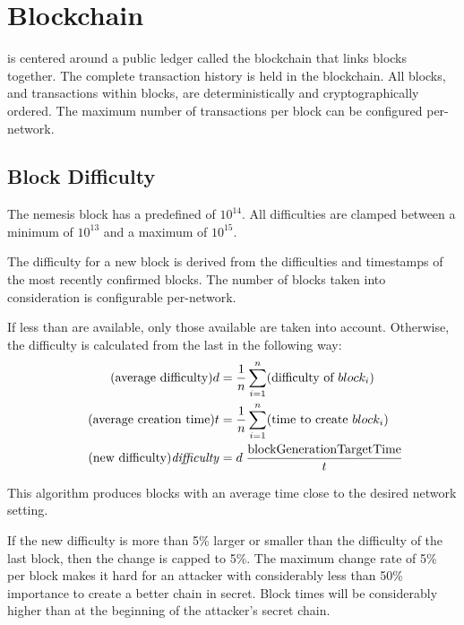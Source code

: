 \section{Blockchain}
\label{sec:blockchain}


\codenamespace is centered around a public ledger called the blockchain that links blocks together.
The complete transaction history is held in the blockchain.
All blocks, and transactions within blocks, are deterministically and cryptographically ordered.
The maximum number of transactions per block can be configured per-network.

\subsection{Block Difficulty}
\label{sec:blockchain:difficulty}

The nemesis block has a predefined  of $10^{14}$.
All difficulties are clamped between a minimum of $10^{13}$ and a maximum of $10^{15}$.

The difficulty for a new block is derived from the difficulties and timestamps of the most recently confirmed blocks.
The number of blocks taken into consideration is configurable per-network.

If less than  are available, only those available are taken into account.
Otherwise, the difficulty is calculated from the last  in the following way:
\begin{align*}
\tag{average difficulty} d &= \frac{1}{n}\sum_{i=1}^n (\text{difficulty of $block_i$}) \\
\tag{average creation time} t &= \frac{1}{n}\sum_{i=1}^n (\text{time to create $block_i$}) \\
\tag{new difficulty} \mathvar{difficulty} &= d \; \frac{\nemsetting{network}{blockGenerationTargetTime}}{t}
\end{align*}

This algorithm produces blocks with an average time close to the desired  network setting.

If the new difficulty is more than 5\% larger or smaller than the difficulty of the last block, then the change is capped to 5\%.
The maximum change rate of 5\% per block makes it hard for an attacker with considerably less than 50\% importance to create a better chain in secret.
Block times will be considerably higher than  at the beginning of the attacker's secret chain.

